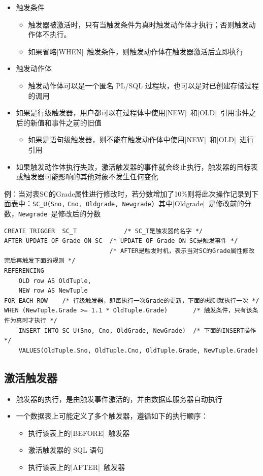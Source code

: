 \begin{itemize}
\begin{itemize}
    \end{itemize}
    \item 触发条件
    \begin{itemize}
        \item 触发器被激活时，只有当触发条件为真时触发动作体才执行；否则触发动作体不执行。
        \item 如果省略\sverb|WHEN|\ 触发条件，则触发动作体在触发器激活后立即执行
    \end{itemize}
    \item 触发动作体
    \begin{itemize}
        \item 触发动作体可以是一个匿名 PL/SQL 过程块，也可以是对已创建存储过程的调用
    \end{itemize}
    \item 如果是行级触发器，用户都可以在过程体中使用\sverb|NEW|\ 和\sverb|OLD|\ 引用事件之后的新值和事件之前的旧值
    \begin{itemize}
        \item 如果是语句级触发器，则不能在触发动作体中使用\sverb|NEW|\ 和\sverb|OLD|\ 进行引用
    \end{itemize}
    \item 如果触发动作体执行失败，激活触发器的事件就会终止执行，触发器的目标表或触发器可能影响的其他对象不发生任何变化
\end{itemize}

例：当对表SC的Grade属性进行修改时，若分数增加了10\%则将此次操作记录到下面表中：\verb|SC_U(Sno,|
\verb|Cno, Oldgrade, Newgrade)|\ 其中\sverb|Oldgrade|\ 是修改前的分数，\verb|Newgrade|\ 是修改后的分数
\begin{lstlisting}
CREATE TRIGGER  SC_T		     /* SC_T是触发器的名字 */
AFTER UPDATE OF Grade ON SC  /* UPDATE OF Grade ON SC是触发事件 */
                             /* AFTER是触发时机，表示当对SC的Grade属性修改完后再触发下面的规则 */
REFERENCING
    OLD row AS OldTuple,
    NEW row AS NewTuple
FOR EACH ROW    /* 行级触发器，即每执行一次Grade的更新，下面的规则就执行一次 */
WHEN (NewTuple.Grade >= 1.1 * OldTuple.Grade)       /* 触发条件，只有该条件为真时才执行 */
    INSERT INTO SC_U(Sno, Cno, OldGrade, NewGrade)  /* 下面的INSERT操作 */
    VALUES(OldTuple.Sno, OldTuple.Cno, OldTuple.Grade, NewTuple.Grade) 
\end{lstlisting}

\subsection{激活触发器}
\begin{itemize}
    \item 触发器的执行，是由触发事件激活的，并由数据库服务器自动执行
    \item 一个数据表上可能定义了多个触发器，遵循如下的执行顺序：
    \begin{itemize}
        \item 执行该表上的\sverb|BEFORE|\ 触发器
        \item 激活触发器的 SQL 语句
        \item 执行该表上的\sverb|AFTER|\ 触发器
    \end{itemize}
\end{itemize}

